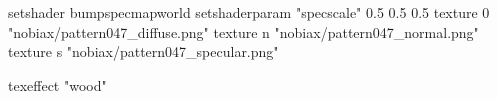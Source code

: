 setshader bumpspecmapworld
setshaderparam "specscale" 0.5 0.5 0.5
   texture 0 "nobiax/pattern047_diffuse.png"
   texture n "nobiax/pattern047_normal.png"
   texture s "nobiax/pattern047_specular.png"

texeffect "wood"
